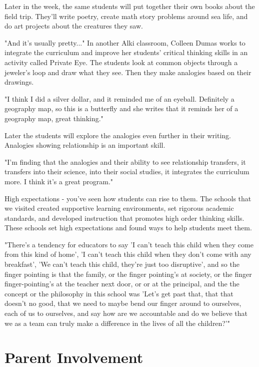 Later in the week, the same students will put together their own books about the field trip.
They'll write poetry, create math story problems around sea life, and do art projects about the creatures they saw.

"And it's usually pretty..." In another Alki classroom, Colleen Dumas works to integrate the curriculum and improve her students' critical thinking skills in an activity called Private Eye.
The students look at common objects through a jeweler's loop and draw what they see.
Then they make analogies based on their drawings.

"I think I did a silver dollar, and it reminded me of an eyeball.
Definitely a geography map, so this is a butterfly and she writes that it reminds her of a geography map, great thinking."

Later the students will explore the analogies even further in their writing.
Analogies showing relationship is an important skill.

"I'm finding that the analogies and their ability to see relationship transfers, it transfers into their science, into their social studies, it integrates the curriculum more.
I think it's a great program."

High expectations - you've seen how students can rise to them.
The schools that we visited created supportive learning environments, set rigorous academic standards, and developed instruction that promotes high order thinking skills.
These schools set high expectations and found ways to help students meet them.

"There's a tendency for educators to say 'I can't teach this child when they come from this kind of home', 'I can't teach this child when they don't come with any breakfast', 'We can't teach this child, they're just too disruptive', and so the finger pointing is that the family, or the finger pointing's at society, or the finger finger-pointing's at the teacher next door, or or at the principal, and the the concept or the philosophy in this school was 'Let's get past that, that that doesn't no good, that we need to maybe bend our finger around to ourselves, each of us to ourselves, and say how are we accountable and do we believe that we as a team can truly make a difference in the lives of all the children?'"

\section{Parent Involvement}

